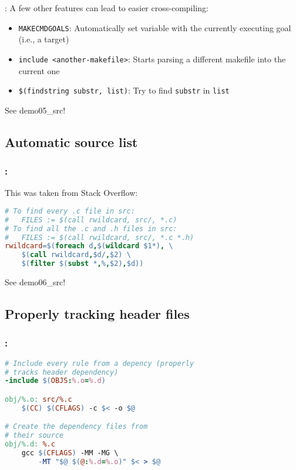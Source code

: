 \begin{frame}{\secname: \small\subsecname\normalsize}
    A few other features can lead to easier cross-compiling:

    \begin{itemize}
        \item \texttt{MAKECMDGOALS}: Automatically set variable with the currently executing goal (i.e., a target)
        \item \texttt{include <another-makefile>}: Starts parsing a different makefile into the current one
        \item \texttt{\$(findstring substr, list)}: Try to find \texttt{substr} in \texttt{list}
    \end{itemize}

    See demo05\_src!
\end{frame}

\subsection{Automatic source list}
\begin{frame}[fragile]
    \frametitle{\secname: \small\subsecname\normalsize}

    This was taken from Stack Overflow:

    \begin{lstlisting}[language=make]
# To find every .c file in src:
#   FILES := $(call rwildcard, src/, *.c)
# To find all the .c and .h files in src:
#   FILES := $(call rwildcard, src/, *.c *.h)
rwildcard=$(foreach d,$(wildcard $1*), \
    $(call rwildcard,$d/,$2) \
    $(filter $(subst *,%,$2),$d))
    \end{lstlisting}

    See demo06\_src!
\end{frame}

\subsection{Properly tracking header files}
\begin{frame}[fragile]
    \frametitle{\secname: \small\subsecname\normalsize}

    \begin{lstlisting}[language=make]
# Include every rule from a depency (properly
# tracks header dependency)
-include $(OBJS:%.o=%.d)

obj/%.o: src/%.c
    $(CC) $(CFLAGS) -c $< -o $@

# Create the dependency files from
# their source
obj/%.d: %.c
    gcc $(CFLAGS) -MM -MG \
        -MT "$@ $(@:%.d=%.o)" $< > $@
    \end{lstlisting}

\end{frame}
